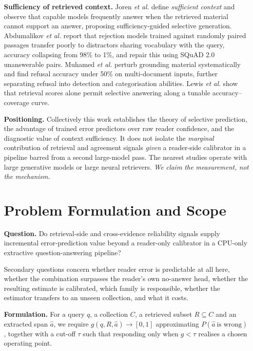 \documentclass[conference]{IEEEtran}
\begin{document}
\textbf{Sufficiency of retrieved context.} Joren \emph{et al.} \cite{joren2025}
define \emph{sufficient context} and observe that capable models frequently answer
when the retrieved material cannot support an answer, proposing sufficiency-guided
selective generation. Abdumalikov \emph{et al.} \cite{abdumalikov2024} report that
rejection models trained against randomly paired passages transfer poorly to
distractors sharing vocabulary with the query, accuracy collapsing from 98\% to
1\%, and repair this using SQuAD 2.0 unanswerable pairs. Muhamed \emph{et al.}
\cite{muhamed2025} perturb grounding material systematically and find refusal
accuracy under 50\% on multi-document inputs, further separating refusal into
detection and categorisation abilities. Lewis \emph{et al.} \cite{lewis2021} show
that retrieval scores alone permit selective answering along a tunable
accuracy--coverage curve.

\textbf{Positioning.} Collectively this work establishes the theory of selective
prediction, the advantage of trained error predictors over raw reader confidence,
and the diagnostic value of context sufficiency. It does not isolate the
\emph{marginal} contribution of retrieval and agreement signals \emph{given} a
reader-side calibrator in a pipeline barred from a second large-model pass. The
nearest studies \cite{joren2025,muhamed2025,lewis2021} operate with large
generative models or large neural retrievers. \emph{We claim the measurement, not
the mechanism.}

\section{Problem Formulation and Scope}
\textbf{Question.} Do retrieval-side and cross-evidence reliability signals supply
incremental error-prediction value beyond a reader-only calibrator in a CPU-only
extractive question-answering pipeline?

Secondary questions concern whether reader error is predictable at all here,
whether the combination surpasses the reader's own no-answer head, whether the
resulting estimate is calibrated, which family is responsible, whether the
estimator transfers to an unseen collection, and what it costs.

\textbf{Formulation.} For a query $q$, a collection $C$, a retrieved subset
$R \subseteq C$ and an extracted span $\hat{a}$, we require
$g(q,R,\hat{a}) \rightarrow [0,1]$ approximating $P(\hat{a}\ \text{is wrong})$,
together with a cut-off $\tau$ such that responding only when $g < \tau$ realises a
chosen operating point.
\end{document}
